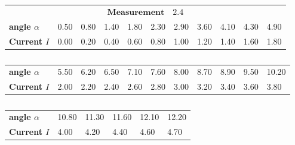    \begin{table}[htdp]
        \begin{tabular}{|l||p{1.1cm}|p{1.1cm}|p{1.1cm}|p{1.1cm}|p{1.1cm}|p{1.1cm}|p{1.1cm}|p{1.1cm}|p{1.1cm}|p{1.1cm}|}
        \hline
            \multicolumn{11}{|c|}{\cellcolor[RGB]{206,250,201}$
            \mathbf{Measurement \quad 2.4}$} \\
\textbf{angle $\alpha$}& 0.50& 0.80& 1.40& 1.80& 2.30& 2.90& 3.60& 4.10& 4.30& 4.90 \\
\textbf{Current $I$}& 0.00& 0.20& 0.40& 0.60& 0.80& 1.00& 1.20& 1.40& 1.60& 1.80 \\

        \hline
        \end{tabular}
        \begin{tabular}{|l||p{1.1cm}|p{1.1cm}|p{1.1cm}|p{1.1cm}|p{1.1cm}|p{1.1cm}|p{1.1cm}|p{1.1cm}|p{1.1cm}|p{1.1cm}|}
        \hline\textbf{angle $\alpha$}& 5.50& 6.20& 6.50& 7.10& 7.60& 8.00& 8.70& 8.90& 9.50& 10.20 \\
\textbf{Current $I$}& 2.00& 2.20& 2.40& 2.60& 2.80& 3.00& 3.20& 3.40& 3.60& 3.80 \\

        \hline
        \end{tabular}
    \begin{tabular}{|l||p{1.1cm}|p{1.1cm}|p{1.1cm}|p{1.1cm}|p{1.1cm}|}
    \hline\textbf{angle $\alpha$}& 10.80& 11.30& 11.60& 12.10& 12.20 \\
\textbf{Current $I$}& 4.00& 4.20& 4.40& 4.60& 4.70 \\

    \hline
    \end{tabular}
    \caption{}
    \label{Power05}
    \end{table}
